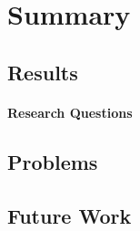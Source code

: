 
\section{Summary} %
\label{sec:summary}


\subsection{Results} %
\label{sub:results}



\paragraph{Research Questions} %
\label{par:result_research_questions}



\subsection{Problems} %
\label{sub:problems}




\subsection{Future Work} %
\label{sub:future_work}




